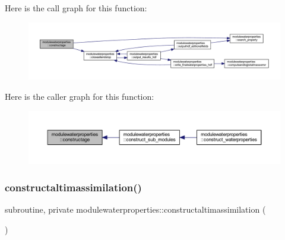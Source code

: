 Here is the call graph for this function\+:\nopagebreak
\begin{figure}[H]
\begin{center}
\leavevmode
\includegraphics[width=350pt]{namespacemodulewaterproperties_ad670c20ce44d68b70fd32aa550c904db_cgraph}
\end{center}
\end{figure}
Here is the caller graph for this function\+:\nopagebreak
\begin{figure}[H]
\begin{center}
\leavevmode
\includegraphics[width=350pt]{namespacemodulewaterproperties_ad670c20ce44d68b70fd32aa550c904db_icgraph}
\end{center}
\end{figure}
\mbox{\label{namespacemodulewaterproperties_ac1893e82a87294024a1db3f0c2a7a842}} 
\subsubsection{\texorpdfstring{constructaltimassimilation()}{constructaltimassimilation()}}
{\footnotesize\ttfamily subroutine, private modulewaterproperties\+::constructaltimassimilation (\begin{DoxyParamCaption}{ }\end{DoxyParamCaption})\hspace{0.3cm}{\ttfamily [private]}}

